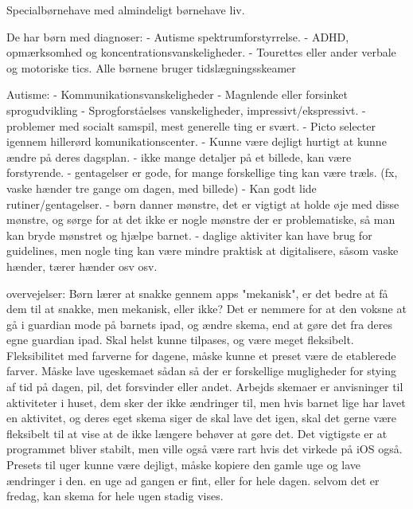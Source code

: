 
Specialbørnehave med almindeligt børnehave liv.

De har børn med diagnoser:
- Autisme spektrumforstyrrelse.
- ADHD, opmærksomhed og koncentrationsvanskeligheder.
- Tourettes eller ander verbale og motoriske tics.
Alle børnene bruger tidslægningsskeamer

Autisme:
- Kommunikationsvanskeligheder
- Magnlende eller forsinket sprogudvikling
- Sprogforståelses vanskeligheder, impressivt/ekspressivt.
- problemer med socialt samspil, mest generelle ting er svært.
- Picto selecter igennem hillerørd komunikationscenter.
- Kunne være dejligt hurtigt at kunne ændre på deres dagsplan.
- ikke mange detaljer på et billede, kan være forstyrende.
- gentagelser er gode, for mange forskellige ting kan være træls. (fx, vaske hænder tre gange om dagen, med billede)
- Kan godt lide rutiner/gentagelser.
- børn danner mønstre, det er vigtigt at holde øje med disse mønstre, og sørge for at det ikke er nogle mønstre der er problematiske, så man kan bryde mønstret og hjælpe barnet. 
- daglige aktiviter kan have brug for guidelines, men nogle ting kan være mindre praktisk at digitalisere, såsom vaske hænder, tærer hænder osv osv. 



overvejelser:
Børn lærer at snakke gennem apps "mekanisk", er det bedre at få dem til at snakke, men mekanisk, eller ikke?
Det er nemmere for at den voksne at gå i guardian mode på barnets ipad, og ændre skema, end at gøre det fra deres egne guardian ipad.
Skal helst kunne tilpases, og være meget fleksibelt.
Fleksibilitet med farverne for dagene, måske kunne et preset være de etablerede farver.
Måske lave ugeskemaet sådan så der er forskellige mugligheder for stying af tid på dagen, pil, det forsvinder eller andet.
Arbejds skemaer er anvisninger til aktiviteter i huset, dem sker der ikke ændringer til, men hvis barnet lige har lavet en aktivitet, og deres eget skema siger de skal lave det igen, skal det gerne være fleksibelt til at vise at de ikke længere behøver at gøre det.
Det vigtigste er at programmet bliver stabilt, men ville også være rart hvis det virkede på iOS også.
Presets til uger kunne være dejligt, måske kopiere den gamle uge og lave ændringer i den.
en uge ad gangen er fint, eller for hele dagen. selvom det er fredag, kan skema for hele ugen stadig vises.














